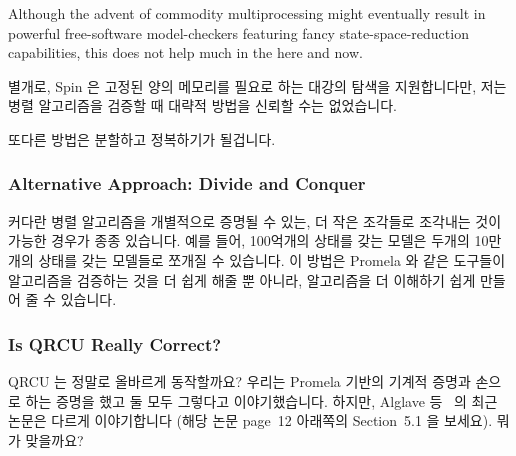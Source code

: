 Although the advent of commodity multiprocessing
might eventually result in powerful free-software model-checkers
featuring fancy state-space-reduction capabilities,
this does not help much in the here and now.
\fi

별개로, Spin 은 고정된 양의 메모리를 필요로 하는 대강의 탐색을 지원합니다만,
저는 병렬 알고리즘을 검증할 때 대략적 방법을 신뢰할 수는 없었습니다.

또다른 방법은 분할하고 정복하기가 될겁니다.
\iffalse

As an aside, there are Spin features that support approximate searches
that require fixed amounts of memory, however, I have never been able
to bring myself to trust approximations when verifying parallel
algorithms.

Another approach might be to divide and conquer.
\fi

\subsubsection{Alternative Approach: Divide and Conquer}
\label{sec:formal:Alternative Approach: Divide and Conquer}

커다란 병렬 알고리즘을 개별적으로 증명될 수 있는, 더 작은 조각들로 조각내는
것이 가능한 경우가 종종 있습니다.
예를 들어, 100억개의 상태를 갖는 모델은 두개의 10만개의 상태를 갖는 모델들로
쪼개질 수 있습니다.
이 방법은 Promela 와 같은 도구들이 알고리즘을 검증하는 것을 더 쉽게 해줄 뿐
아니라, 알고리즘을 더 이해하기 쉽게 만들어 줄 수 있습니다.
\iffalse

It is often possible to break down a larger parallel algorithm into
smaller pieces, which can then be proven separately.
For example, a 10-billion-state model might be broken into a pair
of 100,000-state models.
Taking this approach not only makes it easier for tools such as
Promela to verify your algorithms, it can also make your algorithms
easier to understand.
\fi

\subsubsection{Is QRCU Really Correct?}
\label{sec:formal:Is QRCU Really Correct?}

QRCU 는 정말로 올바르게 동작할까요?
우리는 Promela 기반의 기계적 증명과 손으로 하는 증명을 했고 둘 모두 그렇다고
이야기했습니다.
하지만, Alglave 등~\cite{JadeAlglave2013-cav} 의 최근 논문은 다르게
이야기합니다 (해당 논문 page~12  아래쪽의 Section~5.1 을 보세요).
뭐가 맞을까요?


